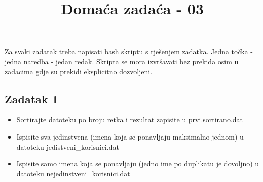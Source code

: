 \documentclass[12pt,a4paper]{article}
\begin{document}
	\title{Domaća zadaća - 03\vspace{-2em}}
	\maketitle
	Za svaki zadatak treba napisati bash skriptu s rješenjem zadatka. Jedna točka - jedna naredba - jedan redak. Skripta se mora izvršavati bez prekida osim u zadacima gdje su prekidi eksplicitno dozvoljeni.
	\subsection*{Zadatak 1}
	\begin{itemize}
    Napomena: Za sve tocke ovog zadatka iskoristite datoteku: prvi.dat. Datoteke koje nastaju kao proizvod 1. zadatka nije potrebno stavljati u git.
    Svaki redak u datoteci prvi.dat ima format <broj retka>:<ime>:<id korisnika>
  \item Sortirajte datoteku po broju retka i rezultat zapisite u prvi.sortirano.dat 
  \item Ispisite sva jedinstvena (imena koja se ponavljaju maksimalno jednom) u datoteku jedistveni_korisnici.dat
  \item Ispisite samo imena koja se ponavljaju (jedno ime po duplikatu je dovoljno) u datoteku nejedinstveni_korisnici.dat
	\end{itemize}
\end{document}
